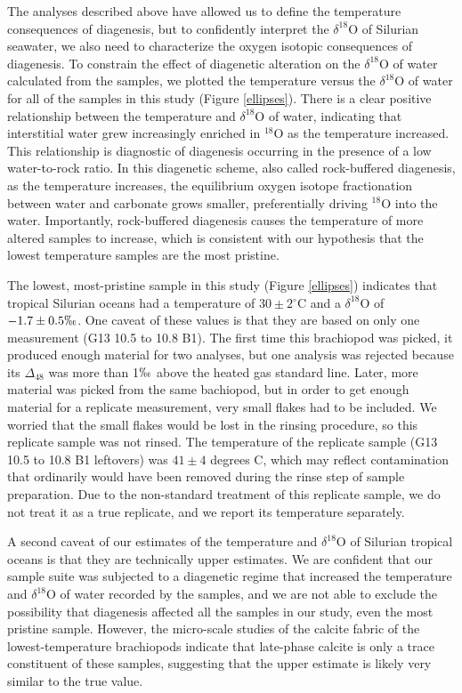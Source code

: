 \documentclass{article}
\newcommand{\deltao}{$\delta^{18}$}
\newcommand{\degrees}{$^{\circ}$}
\begin{document}
The analyses described above have allowed us to define the temperature consequences of diagenesis, but to confidently interpret the \deltao O of Silurian seawater, we also need to characterize the oxygen isotopic consequences of diagenesis. To constrain the effect of diagenetic alteration on the \deltao O of water calculated from the samples, we plotted the temperature versus the \deltao O of water for all of the samples in this study (Figure \ref{ellipses}). There is a clear positive relationship between the temperature and \deltao O of water, indicating that interstitial water grew increasingly enriched in $^{18}$O as the temperature increased. This relationship is diagnostic of diagenesis occurring in the presence of a low water-to-rock ratio. In this diagenetic scheme, also called rock-buffered diagenesis, as the temperature increases, the equilibrium oxygen isotope fractionation between water and carbonate grows smaller, preferentially driving $^{18}$O into the water. Importantly, rock-buffered diagenesis causes the temperature of more altered samples to increase, which is consistent with our hypothesis that the lowest temperature samples are the most pristine. 

The lowest, most-pristine sample in this study (Figure \ref{ellipses}) indicates that tropical Silurian oceans had a temperature of $30\pm 2$\degrees C and a \deltao O of $-1.7\pm 0.5\permil$. One caveat of these values is that they are based on only one measurement (G13 10.5 to 10.8 B1). The first time this brachiopod was picked, it produced enough material for two analyses, but one analysis was rejected because its $\Delta_{48}$ was more than 1$\permil$ above the heated gas standard line. Later, more material was picked from the same bachiopod, but in order to get enough material for a replicate measurement, very small flakes had to be included. We worried that the small flakes would be lost in the rinsing procedure, so this replicate sample was not rinsed. The temperature of the replicate sample (G13 10.5 to 10.8 B1 leftovers) was $41\pm 4$ degrees C, which may reflect contamination that ordinarily would have been removed during the rinse step of sample preparation. Due to the non-standard treatment of this replicate sample, we do not treat it as a true replicate, and we report its temperature separately. 

A second caveat of our estimates of the temperature and \deltao O of Silurian tropical oceans is that they are technically upper estimates. We are confident that our sample suite was subjected to a diagenetic regime that increased the temperature and \deltao O of water recorded by the samples, and we are not able to exclude the possibility that diagenesis affected all the samples in our study, even the most pristine sample. However, the micro-scale studies of the calcite fabric of the lowest-temperature brachiopods indicate that late-phase calcite is only a trace constituent of these samples, suggesting that the upper estimate is likely very similar to the true value. 
\end{document}
